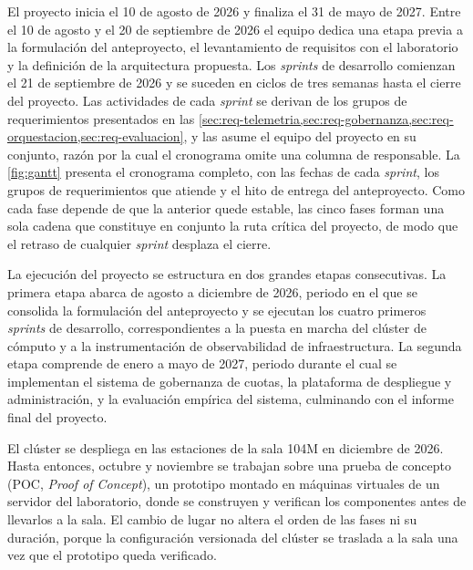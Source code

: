 El proyecto inicia el 10 de agosto de 2026 y finaliza el 31 de mayo de 2027. Entre el 10 de agosto y el 20 de septiembre de 2026 el equipo dedica una etapa previa a la formulación del anteproyecto, el levantamiento de requisitos con el laboratorio y la definición de la arquitectura propuesta. Los \emph{sprints} de desarrollo comienzan el 21 de septiembre de 2026 y se suceden en ciclos de tres semanas hasta el cierre del proyecto. Las actividades de cada \emph{sprint} se derivan de los grupos de requerimientos presentados en las \cref{sec:req-telemetria,sec:req-gobernanza,sec:req-orquestacion,sec:req-evaluacion}, y las asume el equipo del proyecto en su conjunto, razón por la cual el cronograma omite una columna de responsable. La \cref{fig:gantt} presenta el cronograma completo, con las fechas de cada \emph{sprint}, los grupos de requerimientos que atiende y el hito de entrega del anteproyecto. Como cada fase depende de que la anterior quede estable, las cinco fases forman una sola cadena que constituye en conjunto la ruta crítica del proyecto, de modo que el retraso de cualquier \emph{sprint} desplaza el cierre.

La ejecución del proyecto se estructura en dos grandes etapas consecutivas. La primera etapa abarca de agosto a diciembre de 2026, periodo en el que se consolida la formulación del anteproyecto y se ejecutan los cuatro primeros \emph{sprints} de desarrollo, correspondientes a la puesta en marcha del clúster de cómputo y a la instrumentación de observabilidad de infraestructura. La segunda etapa comprende de enero a mayo de 2027, periodo durante el cual se implementan el sistema de gobernanza de cuotas, la plataforma de despliegue y administración, y la evaluación empírica del sistema, culminando con el informe final del proyecto.

El clúster se despliega en las estaciones de la sala 104M en diciembre de 2026. Hasta entonces, octubre y noviembre se trabajan sobre una prueba de concepto (POC, \emph{Proof of Concept}), un prototipo montado en máquinas virtuales de un servidor del laboratorio, donde se construyen y verifican los componentes antes de llevarlos a la sala. El cambio de lugar no altera el orden de las fases ni su duración, porque la configuración versionada del clúster se traslada a la sala una vez que el prototipo queda verificado.

